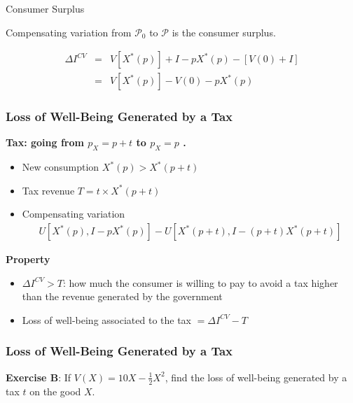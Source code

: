 \documentclass[handout]{beamer}
\newcommand{\mcl}{\mathcal}
\newcommand{\mdp}{\medskip \pause}
\begin{document}
\begin{frame}{Consumer Surplus}

Compensating variation from $\mcl P_0$ to $\mcl P$ is the consumer surplus. 

\begin{eqnarray*}
\Delta I^{CV} &=& V[X^*(p)] + I - pX^*(p) - [V(0) + I] \\
&=& V[X^*(p)] - V(0) - p X^*(p)
\end{eqnarray*}

\end{frame}

\begin{frame} \frametitle{Loss of Well-Being Generated by a Tax}
\textbf{Tax: going from $p_X = p+t$    to $p_X = p$  .} \begin{itemize}
\item New consumption $X^*(p) > X^*(p+t)$ \item Tax revenue $T
= t\times X^*(p+t)$ \item Compensating variation 
\begin{eqnarray*}
U[X^*(p), I - pX^*(p)] - U[X^*(p+t), I - (p+t) X^*(p+t)]
\end{eqnarray*}
\end{itemize}\mdp


\textbf{Property} \begin{itemize} \item $\Delta I^{CV} > T$: how much the consumer is willing to pay to avoid a tax higher than the revenue generated by the government \item Loss of well-being associated to the tax $= \Delta I^{CV} - T$ \end{itemize}



\end{frame}

\begin{frame} \frametitle{Loss of Well-Being Generated by a Tax}

\textbf{Exercise B}: If $V(X) = 10 X - \frac{1}{2}X^2$, find the loss of well-being generated by a tax $t$ on the good $X$. 
\end{frame}
\end{document}
